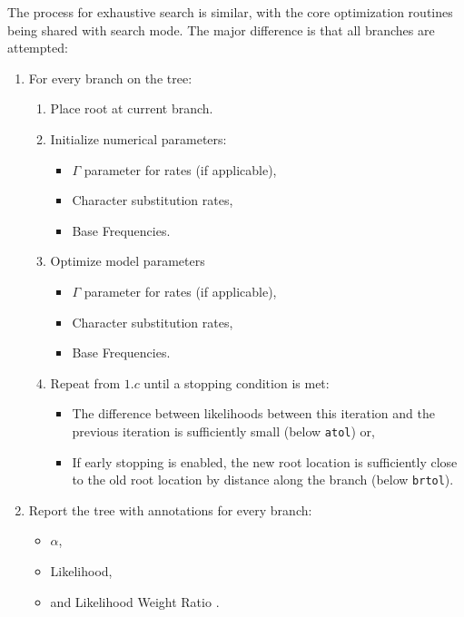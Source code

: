 \documentclass{article}
\begin{document}
The process for exhaustive search is similar, with the core optimization
routines being shared with search mode.
The major difference is that all branches are attempted:

\begin{enumerate}
    \item For every branch on the tree:
    \begin{enumerate}
      \item Place root at current branch.
      \item Initialize numerical parameters:
                \begin{itemize}
                  \item $\Gamma$ parameter for rates (if applicable),
                  \item Character substitution rates,
                  \item Base Frequencies.
                \end{itemize}
          \item Optimize model parameters
                \begin{itemize}
                  \item $\Gamma$ parameter for rates (if applicable),
                  \item Character substitution rates,
                  \item Base Frequencies.
                \end{itemize}
          \item Repeat from $1.c$ until a stopping condition is met:
                \begin{itemize}
                  \item The difference between likelihoods between this
                        iteration and the previous iteration is sufficiently
                        small (below \texttt{atol}) or,
                  \item If early stopping is enabled, the new root location is
                        sufficiently close to the old root location by distance
                        along the branch (below \texttt{brtol}).
                \end{itemize}
    \end{enumerate}
  \item Report the tree with annotations for every branch:
    \begin{itemize}
      \item $\alpha$,
      \item Likelihood,
      \item and Likelihood Weight Ratio \cite{strimmer_inferring_2002}.
    \end{itemize}
\end{enumerate}
\end{document}
